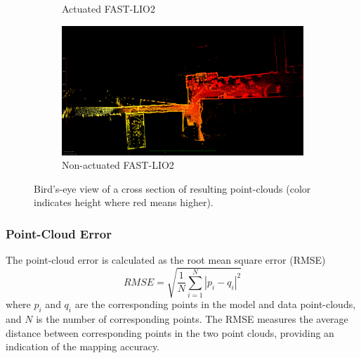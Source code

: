 \documentclass[a4paper, conference]{IEEEtran}
\begin{document}
\begin{figure}[t]
\begin{subfigure}{0.492\columnwidth}
        \caption{Actuated FAST-LIO2}
        \label{fig:act_fast_lio_top}\end{subfigure}
\hfill
\begin{subfigure}{0.492\columnwidth}
        \centering
        \includegraphics[width=\textwidth]{pics/eagle_view/non_lio_top.png}
        \caption{Non-actuated FAST-LIO2}
        \label{fig:non_act_fast_lio_top}
\end{subfigure}
\caption{Bird's-eye view of a cross section of resulting point-clouds (color indicates height where red means higher).}\vspace{-1mm}
\end{figure}

\subsubsection{Point-Cloud Error}
The point-cloud error is calculated as the root mean square error (RMSE)
\begin{equation}
    RMSE = \sqrt{\frac{1}{N} \sum_{i=1}^{N} |p_i - q_i|^2}
\end{equation}
where \( p_i \) and \( q_i \) are the corresponding points in the model and data point-clouds, and \( N \) is the number of corresponding points. 
The RMSE measures the average distance between corresponding points in the two point clouds, providing an indication of the mapping accuracy.

\end{document}
